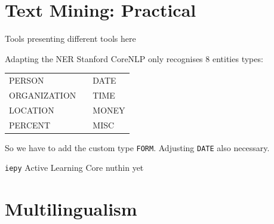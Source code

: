 \documentclass[xcolor=x11names, aspectratio=169,usenames,dvipsnames]{beamer}
\begin{document}
\section{Text Mining: Practical}

\begin{frame}{Tools}
presenting different tools here
\end{frame}

\begin{frame}[fragile]{Adapting the NER}
Stanford CoreNLP only recognises 8 entities types:

\begin{center}\ttfamily
\begin{tabular}{lll}
PERSON&&DATE\\
ORGANIZATION&&TIME\\
LOCATION&&MONEY\\
PERCENT&&MISC
\end{tabular}
\end{center}

So we have to add the custom type \texttt{FORM}. Adjusting \texttt{DATE} also necessary.
\end{frame}

\begin{frame}[fragile]{\texttt{iepy} Active Learning Core}
nuthin yet
\end{frame}

\section{Multilingualism}

\maketitle
\end{document}
